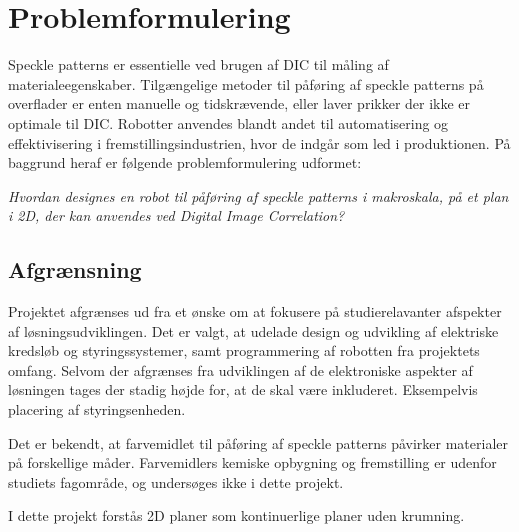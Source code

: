 \chapter{Problemformulering}
Speckle patterns er essentielle ved brugen af DIC til måling af materialeegenskaber. Tilgængelige metoder til påføring af speckle patterns på overflader er enten manuelle og tidskrævende, eller laver prikker der ikke er optimale til DIC. Robotter anvendes blandt andet til automatisering og effektivisering i fremstillingsindustrien, hvor de indgår som led i produktionen. På baggrund heraf er følgende problemformulering udformet:


\begin{displayquote} 
\large
\centering
    \textit{Hvordan designes en robot til påføring af speckle patterns i makroskala, på et plan i 2D, der kan anvendes ved Digital Image Correlation?}
\end{displayquote}


\section{Afgrænsning} \label{Afgrænsning}
Projektet afgrænses ud fra et ønske om at fokusere på studierelavanter afspekter af løsningsudviklingen. Det er valgt, at udelade design og udvikling af elektriske kredsløb og styringssystemer, samt programmering af robotten fra projektets omfang. Selvom der afgrænses fra udviklingen af de elektroniske aspekter af løsningen tages der stadig højde for, at de skal være inkluderet. Eksempelvis placering af styringsenheden. 

Det er bekendt, at farvemidlet til påføring af speckle patterns påvirker materialer på forskellige måder. Farvemidlers kemiske opbygning og fremstilling er udenfor studiets fagområde, og undersøges ikke i dette projekt.


I dette projekt forstås 2D planer som kontinuerlige planer uden krumning.